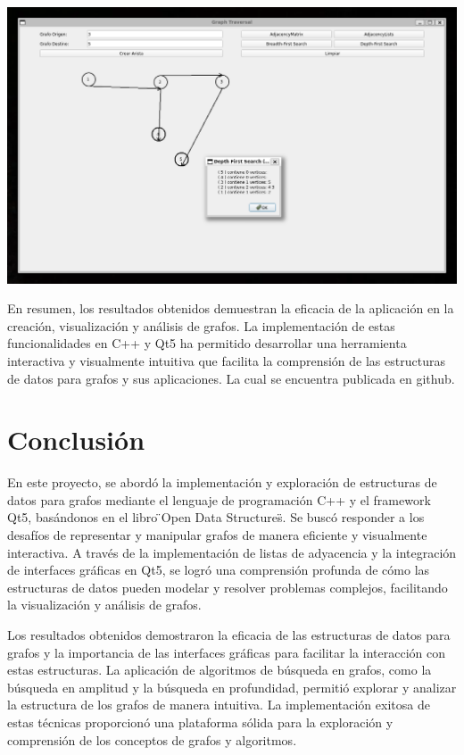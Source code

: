 \documentclass[conference]{IEEEtran}
\begin{document}
\begin{itemize}
        \begin{center}
            \includegraphics[width=\linewidth]{img/DFS.png}
        \end{center}
\end{itemize}

En resumen, los resultados obtenidos demuestran la eficacia de la aplicación en la creación, visualización y análisis de grafos. La implementación de estas funcionalidades en C++ y Qt5 ha permitido desarrollar una herramienta interactiva y visualmente intuitiva que facilita la comprensión de las estructuras de datos para grafos y sus aplicaciones. La cual se encuentra publicada en github. \cite{GitHub2024}



\section{Conclusión}

En este proyecto, se abordó la implementación y exploración de estructuras de datos para grafos mediante el lenguaje de programación C++ y el framework Qt5, basándonos en el libro \"{}Open Data Structures\"{}. Se buscó responder a los desafíos de representar y manipular grafos de manera eficiente y visualmente interactiva. A través de la implementación de listas de adyacencia y la integración de interfaces gráficas en Qt5, se logró una comprensión profunda de cómo las estructuras de datos pueden modelar y resolver problemas complejos, facilitando la visualización y análisis de grafos.

Los resultados obtenidos demostraron la eficacia de las estructuras de datos para grafos y la importancia de las interfaces gráficas para facilitar la interacción con estas estructuras. La aplicación de algoritmos de búsqueda en grafos, como la búsqueda en amplitud y la búsqueda en profundidad, permitió explorar y analizar la estructura de los grafos de manera intuitiva. La implementación exitosa de estas técnicas proporcionó una plataforma sólida para la exploración y comprensión de los conceptos de grafos y algoritmos.
\end{document}
